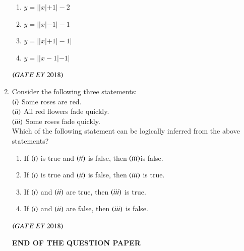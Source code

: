 \documentclass[journal]{IEEEtran}
\numberwithin{equation}{enumi}
\numberwithin{figure}{enumi}
\begin{document}
\begin{enumerate}
\begin{figure}[H]
    \caption{}
    \label{fig:9}
   \end{figure}
\begin{multicols}{2}
\begin{enumerate}
    \item $y = ||x|+1|-2$ 
    \item $y = ||x|-1|-1$
    \item $y = ||x|+1|-1|$
    \item $y = ||x-1|-1|$
\end{enumerate}
\end{multicols}
\hfill{$\brak{ GATE\ EY\ 2018}$}
\bigskip
\item Consider the following three statements:\\$\left(i\right)$ Some roses are red.\\$\left(ii\right)$ All red flowers fade quickly.\\$\left(iii\right)$ Some roses fade quickly.\\Which of the following statement can be logically inferred from the above statements?
\begin{enumerate}
    \item If $\left(i\right)$ is true and $\left(ii\right)$ is false, then $\left(iii\right)$is false.
    \item If $\left(i\right)$ is true and $\left(ii\right)$ is false, then $\left(iii\right)$ is true.
    \item If $\left(i\right)$ and $\left(ii\right)$ are true, then $\left(iii\right)$ is true.
    \item If $\left(i\right)$ and $\left(ii\right)$ are false, then $\left(iii\right)$ is false.
\end{enumerate}
\hfill{$\brak{ GATE\ EY\ 2018}$}
\begin{center}
\Large
\textbf{END OF THE QUESTION PAPER}
\end{center}
\end{enumerate}
\end{document}

